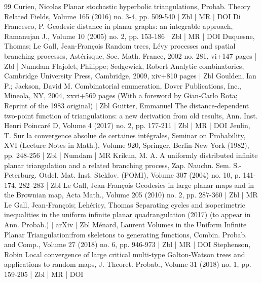 \begin{thebibliography}{99}
Curien, Nicolas Planar stochastic hyperbolic triangulations, Probab. Theory Related Fields, Volume 165 (2016) no. 3-4, pp. 509-540 | Zbl | MR | DOI
Di Francesco, P. Geodesic distance in planar graphs: an integrable approach, Ramanujan J., Volume 10 (2005) no. 2, pp. 153-186 | Zbl | MR | DOI
Duquesne, Thomas; Le Gall, Jean-François Random trees, Lévy processes and spatial branching processes, Astérisque, Soc. Math. France, 2002 no. 281, vi+147 pages | Zbl | Numdam
Flajolet, Philippe; Sedgewick, Robert Analytic combinatorics, Cambridge University Press, Cambridge, 2009, xiv+810 pages | Zbl
Goulden, Ian P.; Jackson, David M. Combinatorial enumeration, Dover Publications, Inc., Mineola, NY, 2004, xxvi+569 pages (With a foreword by Gian-Carlo Rota; Reprint of the 1983 original) | Zbl
Guitter, Emmanuel The distance-dependent two-point function of triangulations: a new derivation from old results, Ann. Inst. Henri Poincaré D, Volume 4 (2017) no. 2, pp. 177-211 | Zbl | MR | DOI
Jeulin, T. Sur la convergence absolue de certaines intégrales, Seminar on Probability, XVI (Lecture Notes in Math.), Volume 920, Springer, Berlin-New York (1982), pp. 248-256 | Zbl | Numdam | MR
Krikun, M. A. A uniformly distributed infinite planar triangulation and a related branching process, Zap. Nauchn. Sem. S.-Peterburg. Otdel. Mat. Inst. Steklov. (POMI), Volume 307 (2004) no. 10, p. 141-174, 282–283 | Zbl
Le Gall, Jean-François Geodesics in large planar maps and in the Brownian map, Acta Math., Volume 205 (2010) no. 2, pp. 287-360 | Zbl | MR
Le Gall, Jean-François; Lehéricy, Thomas Separating cycles and isoperimetric inequalities in the uniform infinite planar quadrangulation (2017) (to appear in Ann. Probab.) | arXiv | Zbl
Ménard, Laurent Volumes in the Uniform Infinite Planar Triangulation:from skeletons to generating functions, Combin. Probab. and Comp., Volume 27 (2018) no. 6, pp. 946-973 | Zbl | MR | DOI
Stephenson, Robin Local convergence of large critical multi-type Galton-Watson trees and applications to random maps, J. Theoret. Probab., Volume 31 (2018) no. 1, pp. 159-205 | Zbl | MR | DOI
\end{thebibliography}
